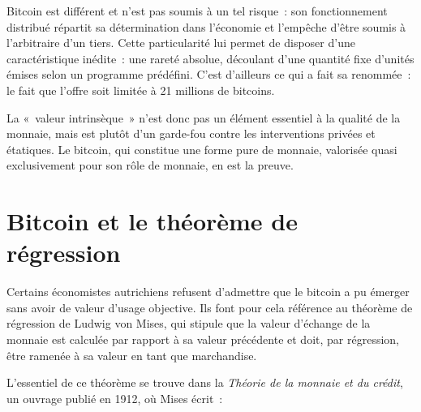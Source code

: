 Bitcoin est différent et n'est pas soumis à un tel risque~: son fonctionnement distribué répartit sa détermination dans l'économie et l'empêche d'être soumis à l'arbitraire d'un tiers. Cette particularité lui permet de disposer d'une caractéristique inédite~: une rareté absolue, découlant d'une quantité fixe d'unités émises selon un programme prédéfini. C'est d'ailleurs ce qui a fait sa renommée~: le fait que l'offre soit limitée à 21 millions de bitcoins.

La «~valeur intrinsèque~» n'est donc pas un élément essentiel à la qualité de la monnaie, mais est plutôt d'un garde-fou contre les interventions privées et étatiques. Le bitcoin, qui constitue une forme pure de monnaie, valorisée quasi exclusivement pour son rôle de monnaie, en est la preuve.

\section*{Bitcoin et le théorème de régression}

Certains économistes autrichiens refusent d'admettre que le bitcoin a pu émerger sans avoir de valeur d'usage objective. Ils font pour cela référence au théorème de régression de Ludwig von Mises, qui stipule que la valeur d'échange de la monnaie est calculée par rapport à sa valeur précédente et doit, par régression, être ramenée à sa valeur en tant que marchandise.

L'essentiel de ce théorème se trouve dans la \emph{Théorie de la monnaie et du crédit}, un ouvrage publié en 1912, où Mises écrit~: 

